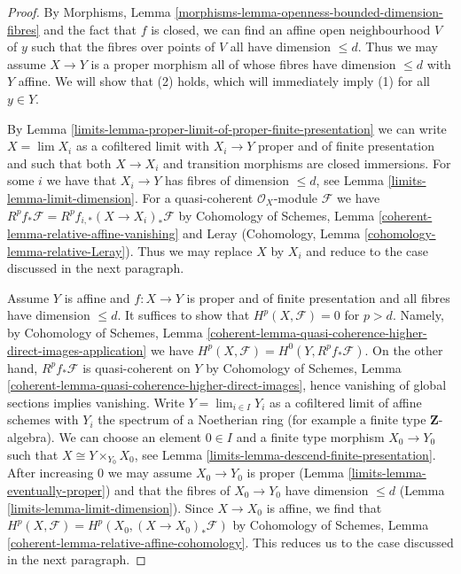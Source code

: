 \begin{proof}

By Morphisms, Lemma
\ref{morphisms-lemma-openness-bounded-dimension-fibres}
and the fact that $f$ is closed, we can find an affine open neighbourhood
$V$ of $y$ such that the fibres over points of $V$ all have dimension
$\leq d$. Thus we may assume $X \to Y$ is a proper morphism all
of whose fibres have dimension $\leq d$ with $Y$ affine.
We will show that (2) holds, which will immediately imply (1)
for all $y \in Y$.

\medskip\noindent
By Lemma \ref{limits-lemma-proper-limit-of-proper-finite-presentation}
we can write $X = \lim X_i$ as a cofiltered limit with $X_i \to Y$ proper
and of finite presentation and such that both $X \to X_i$
and transition morphisms are closed immersions.
For some $i$ we have that $X_i \to Y$ has fibres of dimension $\leq d$,
see Lemma \ref{limits-lemma-limit-dimension}.
For a quasi-coherent $\mathcal{O}_X$-module $\mathcal{F}$ we have
$R^pf_*\mathcal{F} = R^pf_{i, *}(X \to X_i)_*\mathcal{F}$ by
Cohomology of Schemes, Lemma \ref{coherent-lemma-relative-affine-vanishing}
and Leray (Cohomology, Lemma \ref{cohomology-lemma-relative-Leray}).
Thus we may replace $X$ by $X_i$ and
reduce to the case discussed in the next paragraph.

\medskip\noindent
Assume $Y$ is affine and $f : X \to Y$ is proper and of finite presentation
and all fibres have dimension $\leq d$. It suffices to show that
$H^p(X, \mathcal{F}) = 0$ for $p > d$. Namely, by
Cohomology of Schemes, Lemma
\ref{coherent-lemma-quasi-coherence-higher-direct-images-application}
we have $H^p(X, \mathcal{F}) = H^0(Y, R^pf_*\mathcal{F})$.
On the other hand, $R^pf_*\mathcal{F}$ is quasi-coherent on $Y$
by Cohomology of Schemes, Lemma
\ref{coherent-lemma-quasi-coherence-higher-direct-images},
hence vanishing of global sections implies vanishing.
Write $Y = \lim_{i \in I} Y_i$ as a cofiltered limit of affine schemes
with $Y_i$ the spectrum of a Noetherian ring
(for example a finite type $\mathbf{Z}$-algebra).
We can choose an element $0 \in I$ and a finite type morphism
$X_0 \to Y_0$ such that $X \cong Y \times_{Y_0} X_0$, see
Lemma \ref{limits-lemma-descend-finite-presentation}.
After increasing $0$ we may assume $X_0 \to Y_0$ is proper
(Lemma \ref{limits-lemma-eventually-proper})
and that the fibres of $X_0 \to Y_0$ have dimension $\leq d$
(Lemma \ref{limits-lemma-limit-dimension}).
Since $X \to X_0$ is affine, we find that
$H^p(X, \mathcal{F}) = H^p(X_0, (X \to X_0)_*\mathcal{F})$ by
Cohomology of Schemes, Lemma \ref{coherent-lemma-relative-affine-cohomology}.
This reduces us to the case discussed in the next paragraph.


\end{proof}

